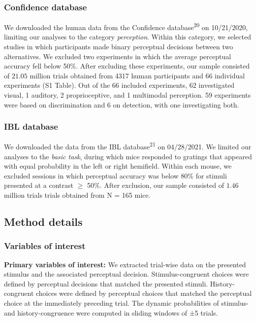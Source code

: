 \documentclass[
]{article}
\begin{document}
\hypertarget{confidence-database}{%
\subsubsection{Confidence database}\label{confidence-database}}

We downloaded the human data from the Confidence
database\textsuperscript{20} on 10/21/2020, limiting our analyses to the
category \emph{perception}. Within this category, we selected studies in
which participants made binary perceptual decisions between two
alternatives. We excluded two experiments in which the average
perceptual accuracy fell below 50\%. After excluding these experiments,
our sample consisted of \(21.05\) million trials obtained from 4317
human participants and 66 individual experiments (S1 Table).
Out of the 66 included experiments, 62 investigated visual, 1 auditory,
2 proprioceptive, and 1 multimodal perception. 59 experiments were based
on discrimination and 6 on detection, with one investigating both.

\hypertarget{ibl-database}{%
\subsubsection{IBL database}\label{ibl-database}}

We downloaded the data from the IBL database\textsuperscript{21} on
04/28/2021. We limited our analyses to the \emph{basic task}, during
which mice responded to gratings that appeared with equal probability in
the left or right hemifield. Within each mouse, we excluded sessions in
which perceptual accuracy was below 80\% for stimuli presented at a
contrast \(\geq\) 50\%. After exclusion, our sample consisted of
\(1.46\) million trials trials obtained from N = 165 mice.

\hypertarget{method-details}{%
\subsection{Method details}\label{method-details}}

\hypertarget{variables-of-interest}{%
\subsubsection{Variables of interest}\label{variables-of-interest}}

\textbf{Primary variables of interest:} We extracted trial-wise data on
the presented stimulus and the associated perceptual decision.
Stimulus-congruent choices were defined by perceptual decisions that
matched the presented stimuli. History-congruent choices were defined by
perceptual choices that matched the perceptual choice at the immediately
preceding trial. The dynamic probabilities of stimulus- and
history-congruence were computed in sliding windows of ±5 trials.
\end{document}
